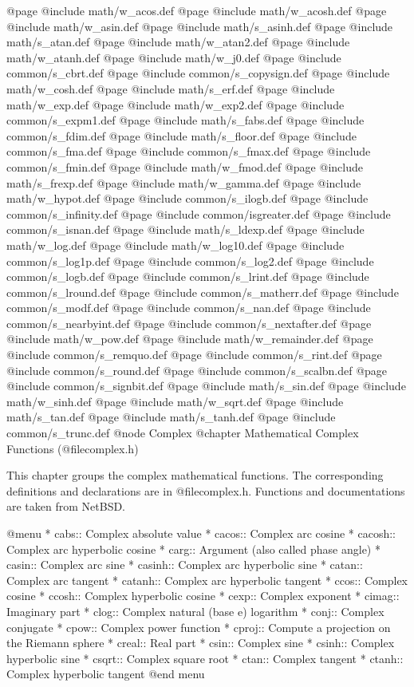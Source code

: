 @page
@include   math/w_acos.def
@page
@include   math/w_acosh.def
@page
@include   math/w_asin.def
@page 
@include   math/s_asinh.def
@page
@include   math/s_atan.def
@page 
@include   math/w_atan2.def
@page
@include   math/w_atanh.def
@page 
@include   math/w_j0.def
@page
@include common/s_cbrt.def
@page
@include common/s_copysign.def
@page
@include   math/w_cosh.def
@page
@include   math/s_erf.def
@page
@include   math/w_exp.def
@page
@include   math/w_exp2.def
@page
@include common/s_expm1.def
@page
@include   math/s_fabs.def
@page
@include common/s_fdim.def
@page
@include   math/s_floor.def
@page
@include common/s_fma.def
@page
@include common/s_fmax.def
@page
@include common/s_fmin.def
@page
@include   math/w_fmod.def
@page
@include   math/s_frexp.def
@page
@include   math/w_gamma.def
@page
@include   math/w_hypot.def
@page
@include common/s_ilogb.def
@page
@include common/s_infinity.def
@page
@include   common/isgreater.def
@page
@include common/s_isnan.def
@page
@include   math/s_ldexp.def
@page
@include   math/w_log.def
@page
@include   math/w_log10.def
@page
@include common/s_log1p.def
@page
@include common/s_log2.def
@page
@include common/s_logb.def
@page
@include common/s_lrint.def
@page
@include common/s_lround.def
@page
@include common/s_matherr.def
@page
@include common/s_modf.def
@page
@include common/s_nan.def
@page
@include common/s_nearbyint.def
@page
@include common/s_nextafter.def
@page
@include   math/w_pow.def
@page
@include   math/w_remainder.def
@page
@include common/s_remquo.def
@page
@include common/s_rint.def
@page
@include common/s_round.def
@page
@include common/s_scalbn.def
@page
@include common/s_signbit.def
@page
@include   math/s_sin.def
@page
@include   math/w_sinh.def
@page
@include   math/w_sqrt.def
@page
@include   math/s_tan.def
@page
@include   math/s_tanh.def
@page
@include common/s_trunc.def
@node Complex
@chapter Mathematical Complex Functions (@file{complex.h})

This chapter groups the complex mathematical functions.  The
corresponding definitions and declarations are in @file{complex.h}.  
Functions and documentations are taken from NetBSD.

@menu 
* cabs::	Complex absolute value
* cacos::	Complex arc cosine
* cacosh::	Complex arc hyperbolic cosine
* carg::	Argument (also called phase angle)
* casin::	Complex arc sine
* casinh::	Complex arc hyperbolic sine
* catan::	Complex arc tangent
* catanh::	Complex arc hyperbolic tangent
* ccos::	Complex cosine
* ccosh::	Complex hyperbolic cosine
* cexp::	Complex exponent
* cimag::	Imaginary part
* clog::	Complex natural (base e) logarithm
* conj::	Complex conjugate
* cpow::	Complex power function
* cproj::	Compute a projection on the Riemann sphere
* creal::	Real part
* csin::	Complex sine
* csinh::	Complex hyperbolic sine
* csqrt::	Complex square root
* ctan::	Complex tangent
* ctanh::	Complex hyperbolic tangent
@end menu

